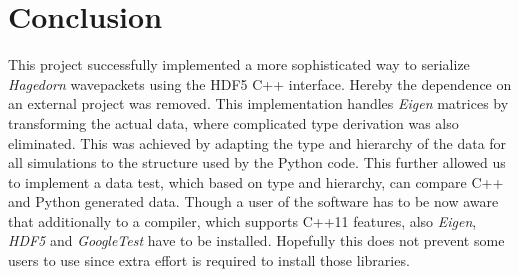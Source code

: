 \chapter{Conclusion}
This project successfully implemented a more sophisticated way to serialize \textit{Hagedorn} wavepackets using the HDF5 C++ interface. Hereby the dependence on an external project \cite{eigen3-hdf5} was removed. This implementation handles \textit{Eigen} matrices by transforming the actual data, where complicated type derivation was also eliminated. This was achieved by adapting the type and hierarchy of the data for all simulations to the structure used by the Python code. This further allowed us to implement a data test, which based on type and hierarchy, can compare C++ and Python generated data. Though a user of the software \cite{libwaveblocks} has to be now aware that additionally to a compiler, which supports C++11 features, also \textit{Eigen}, \textit{HDF5} and \textit{GoogleTest} have to be installed. Hopefully this does not prevent some users to use \cite{libwaveblocks} since extra effort is required to install those libraries.


